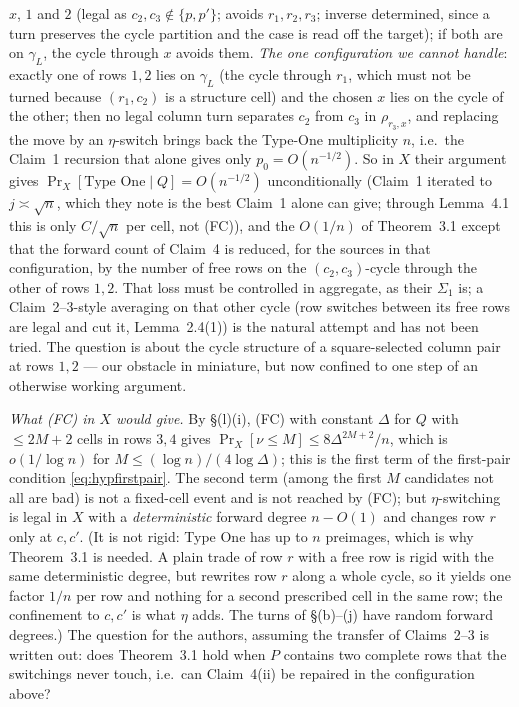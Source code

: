 $x$, $1$ and $2$ (legal as $c_2,c_3\notin\{p,p'\}$; avoids
$r_1,r_2,r_3$; inverse determined, since a turn preserves the cycle
partition and the case is read off the target); if both are on
$\gamma_L$, the cycle through $x$ avoids them.  \emph{The
one configuration we cannot handle}: exactly one of rows $1,2$ lies on
$\gamma_L$ (the cycle through $r_1$, which must not be turned because
$(r_1,c_2)$ is a structure cell) and the chosen $x$ lies on the cycle
of the other; then no legal column turn separates $c_2$ from $c_3$ in
$\rho_{r_3,x}$, and replacing the move by an $\eta$-switch brings back
the Type-One multiplicity $n$, i.e.\ the Claim~1 recursion that alone
gives only $p_0=O(n^{-1/2})$.  So in $X$ their argument gives
$\Pr_X[\text{Type One}\mid Q]=O(n^{-1/2})$ unconditionally (Claim~1
iterated to $j\asymp\sqrt n$, which they note is the best Claim~1 alone
can give; through Lemma~4.1 this is only $C/\sqrt n$ per cell, not
(FC)), and the $O(1/n)$ of Theorem~3.1 except that the forward count
of Claim~4 is reduced, for the sources in that configuration, by the
number of free rows on the $(c_2,c_3)$-cycle through the other of
rows $1,2$.  That loss must be controlled in aggregate, as their
$\Sigma_1$ is; a Claim~2--3-style averaging on that other cycle (row
switches between its free rows are legal and cut it, Lemma~2.4(1)) is
the natural attempt and has not been tried.  The question is about
the cycle structure of a square-selected column pair at rows $1,2$
--- our obstacle in miniature, but now confined to one step of an
otherwise working argument.

\emph{What (FC) in $X$ would give.}  By \S(l)(i), (FC) with constant
$\Delta$ for $Q$ with $\le2M+2$ cells in rows $3,4$ gives
$\Pr_X[\nu\le M]\le8\Delta^{2M+2}/n$, which is $o(1/\log n)$ for
$M\le(\log n)/(4\log\Delta)$; this is the first term of the first-pair
condition \eqref{eq:hypfirstpair}.  The second term (among the first
$M$ candidates not all are bad) is not a fixed-cell event and is not
reached by (FC); but $\eta$-switching is legal in $X$ with a
\emph{deterministic} forward degree $n-O(1)$ and changes row $r$ only
at $c,c'$.  (It is not rigid: Type One has up to $n$ preimages, which is
why Theorem~3.1 is needed.  A plain trade of row $r$ with a free row is
rigid with the same deterministic degree, but rewrites row $r$ along a
whole cycle, so it yields one factor $1/n$ per row and nothing for a
second prescribed cell in the same row; the confinement to $c,c'$ is
what $\eta$ adds.  The turns of \S(b)--(j) have random forward degrees.)
The question for the authors, assuming the transfer of Claims~2--3 is
written out: does Theorem~3.1 hold when $P$ contains two complete rows
that the switchings never touch, i.e.\ can Claim~4(ii) be repaired in
the configuration above?

